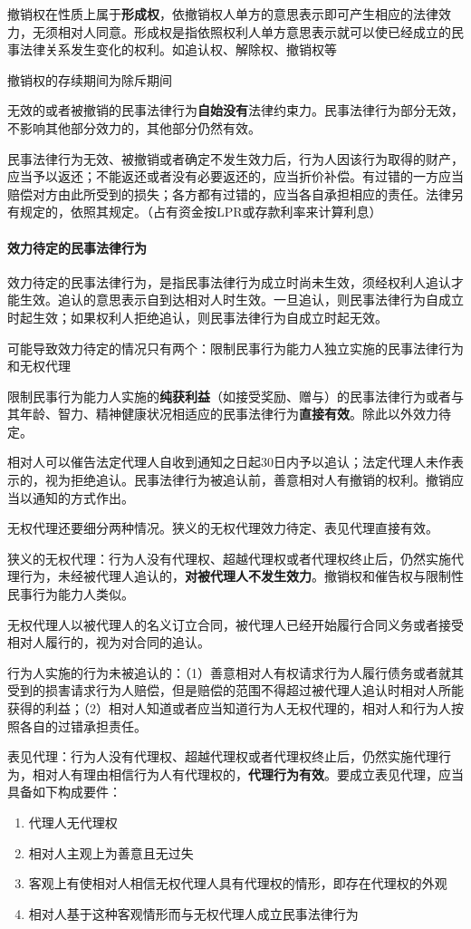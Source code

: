 \documentclass[UTF8,12pt]{ctexart}
\numberwithin{equation}{section} %
\numberwithin{figure}{section}
\numberwithin{table}{section}
\begin{document}
	撤销权在性质上属于\textbf{形成权}，依撤销权人单方的意思表示即可产生相应的法律效力，无须相对人同意。形成权是指依照权利人单方意思表示就可以使已经成立的民事法律关系发生变化的权利。如追认权、解除权、撤销权等
	
	撤销权的存续期间为除斥期间
	
	无效的或者被撤销的民事法律行为\textbf{自始没有}法律约束力。民事法律行为部分无效，不影响其他部分效力的，其他部分仍然有效。
	
	民事法律行为无效、被撤销或者确定不发生效力后，行为人因该行为取得的财产，应当予以返还；不能返还或者没有必要返还的，应当折价补偿。有过错的一方应当赔偿对方由此所受到的损失；各方都有过错的，应当各自承担相应的责任。法律另有规定的，依照其规定。（占有资金按LPR或存款利率来计算利息）
	
	\paragraph{效力待定的民事法律行为}
	效力待定的民事法律行为，是指民事法律行为成立时尚未生效，须经权利人追认才能生效。追认的意思表示自到达相对人时生效。一旦追认，则民事法律行为自成立时起生效；如果权利人拒绝追认，则民事法律行为自成立时起无效。
	
	可能导致效力待定的情况只有两个：限制民事行为能力人独立实施的民事法律行为和无权代理
	
	限制民事行为能力人实施的\textbf{纯获利益}（如接受奖励、赠与）的民事法律行为或者与其年龄、智力、精神健康状况相适应的民事法律行为\textbf{直接有效}。除此以外效力待定。
	
	相对人可以催告法定代理人自收到通知之日起30日内予以追认；法定代理人未作表示的，视为拒绝追认。民事法律行为被追认前，善意相对人有撤销的权利。撤销应当以通知的方式作出。
	
	无权代理还要细分两种情况。狭义的无权代理效力待定、表见代理直接有效。
	
	狭义的无权代理：行为人没有代理权、超越代理权或者代理权终止后，仍然实施代理行为，未经被代理人追认的，\textbf{对被代理人不发生效力}。撤销权和催告权与限制性民事行为能力人类似。
	
	无权代理人以被代理人的名义订立合同，被代理人已经开始履行合同义务或者接受相对人履行的，视为对合同的追认。
	
	行为人实施的行为未被追认的：（1）善意相对人有权请求行为人履行债务或者就其受到的损害请求行为人赔偿，但是赔偿的范围不得超过被代理人追认时相对人所能获得的利益；（2）相对人知道或者应当知道行为人无权代理的，相对人和行为人按照各自的过错承担责任。
	
	表见代理：行为人没有代理权、超越代理权或者代理权终止后，仍然实施代理行为，相对人有理由相信行为人有代理权的，\textbf{代理行为有效}。要成立表见代理，应当具备如下构成要件：
	\begin{enumerate}
		\item 代理人无代理权
		
		\item 相对人主观上为善意且无过失
		
		\item 客观上有使相对人相信无权代理人具有代理权的情形，即存在代理权的外观
		
		\item 相对人基于这种客观情形而与无权代理人成立民事法律行为
	\end{enumerate}
	
\end{document}
